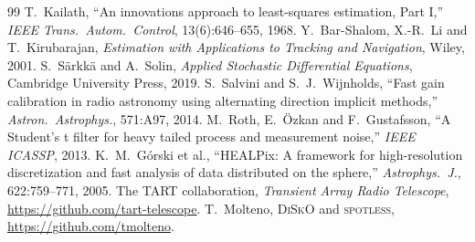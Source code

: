 \documentclass[11pt]{article}
\begin{document}
\begin{thebibliography}{99}
\small
{} T.~Kailath, ``An innovations approach to least-squares estimation, Part I,'' \emph{IEEE Trans.\ Autom.\ Control}, 13(6):646--655, 1968.
 Y.~Bar-Shalom, X.-R.~Li and T.~Kirubarajan, \emph{Estimation with Applications to Tracking and Navigation}, Wiley, 2001.
 S.~S\"arkk\"a and A.~Solin, \emph{Applied Stochastic Differential Equations}, Cambridge University Press, 2019.
 S.~Salvini and S.~J.~Wijnholds, ``Fast gain calibration in radio astronomy using alternating direction implicit methods,'' \emph{Astron.\ Astrophys.}, 571:A97, 2014.
 M.~Roth, E.~\"Ozkan and F.~Gustafsson, ``A Student's t filter for heavy tailed process and measurement noise,'' \emph{IEEE ICASSP}, 2013.
 K.~M.~G\'orski et al., ``HEALPix: A framework for high-resolution discretization and fast analysis of data distributed on the sphere,'' \emph{Astrophys.\ J.}, 622:759--771, 2005.
 The TART collaboration, \emph{Transient Array Radio Telescope}, \url{https://github.com/tart-telescope}.
 T.~Molteno, \textsc{DiSkO} and \textsc{spotless}, \url{https://github.com/tmolteno}.
\end{thebibliography}
\end{document}
